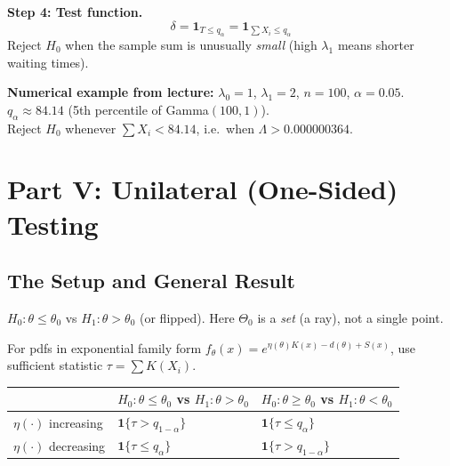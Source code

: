 \documentclass[11pt,a4paper]{article}
\begin{document}
\textbf{Step 4: Test function.}
\[
  \boxed{\delta = \mathbf{1}_{T\leq q_\alpha} = \mathbf{1}_{\sum X_i\leq q_\alpha}}
\]
Reject $H_0$ when the sample sum is unusually \emph{small} (high $\lambda_1$ means shorter waiting times).

\begin{tcolorbox}[successbox]
\textbf{Numerical example from lecture:} $\lambda_0=1$, $\lambda_1=2$, $n=100$, $\alpha=0.05$.\\
$q_\alpha \approx 84.14$ (5th percentile of Gamma$(100,1)$).\\
Reject $H_0$ whenever $\sum X_i < 84.14$, i.e.\ when $\Lambda > 0.000000364$.
\end{tcolorbox}

\section{Part V: Unilateral (One-Sided) Testing}

\subsection{The Setup and General Result}

$H_0:\theta\leq\theta_0$ vs $H_1:\theta>\theta_0$ (or flipped). Here $\Theta_0$ is a \emph{set} (a ray), not a single point.

\begin{tcolorbox}[defbox, title={General framework for exponential families (Lecture slide 24)}]
For pdfs in exponential family form $f_\theta(x) = e^{\eta(\theta)K(x)-d(\theta)+S(x)}$, use sufficient statistic $\tau = \sum K(X_i)$.

\begin{center}
\renewcommand{\arraystretch}{1.4}
\begin{tabular}{@{}lll@{}}
\toprule
& $H_0:\theta\leq\theta_0$ vs $H_1:\theta>\theta_0$ & $H_0:\theta\geq\theta_0$ vs $H_1:\theta<\theta_0$\\
\midrule
$\eta(\cdot)$ increasing & $\mathbf{1}\{\tau > q_{1-\alpha}\}$ & $\mathbf{1}\{\tau \leq q_\alpha\}$\\
$\eta(\cdot)$ decreasing & $\mathbf{1}\{\tau \leq q_\alpha\}$ & $\mathbf{1}\{\tau > q_{1-\alpha}\}$\\
\bottomrule
\end{tabular}
\end{center}
\end{tcolorbox}
\end{document}
